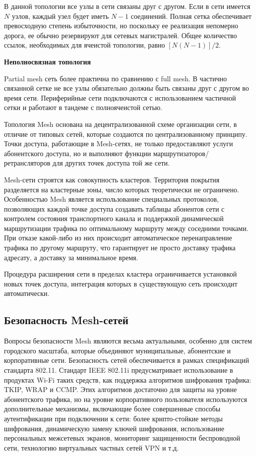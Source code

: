 \documentclass[a4paper]{article}
\begin{document}
В данной топологии все узлы в сети связаны друг с другом. Если в сети имеется $N$ узлов, каждый узел будет иметь $N-1$ соединений.
 Полная сетка обеспечивает превосходную степень избыточности, но поскольку ее реализация непомерно дорога, ее обычно резервируют для сетевых магистралей.
 Общее количество ссылок, необходимых для ячеистой топологии, равно $[N(N-1)]/2$.

\textbf{Неполносвязная топология}

Partial mesh сеть более практична по сравнению с full mesh. В частично связанной сетке не все узлы обязательно должны быть связаны друг с другом во время сети. 
Периферийные сети подключаются с использованием частичной сетки и работают в тандеме с полноячеистой сетью.

Топология Mesh основана на децентрализованной схеме организации сети, в отличие от типовых сетей, которые создаются по централизованному принципу.
 Точки доступа, работающие в Mesh-сетях, не только предоставляют услуги абонентского доступа, но и выполняют функции маршрутизаторов/ретрансляторов для других точек доступа той же сети. 

Mesh-сети строятся как совокупность кластеров. Территория покрытия разделяется на кластерные зоны, число которых теоретически не ограничено. 
Особенностью Mesh является использование специальных протоколов, позволяющих каждой точке доступа создавать таблицы абонентов сети с контролем состояния транспортного канала и поддержкой динамической маршрутизации трафика по оптимальному маршруту между соседними точками. 
При отказе какой-либо из них происходит автоматическое перенаправление трафика по другому маршруту, что гарантирует не просто доставку трафика адресату, а доставку за минимальное время.

Процедура расширения сети в пределах кластера ограничивается установкой новых точек доступа, интеграция которых в существующую сеть происходит автоматически.

\subsection{Безопасность Mesh-сетей}

Вопросы безопасности Mesh  являются весьма актуальными, особенно для систем городского масштаба, которые объединяют муниципальные, абонентские и корпоративные сети. 
Безопасность сетей обеспечивается в рамках спецификаций стандарта 802.11. Стандарт IEEE 802.11i предусматривает использование в продуктах Wi-Fi таких средств, как поддержка алгоритмов шифрования трафика: TKIP, WRAP и CCMP.
 Этих алгоритмов достаточно для защиты на уровне абонентского трафика, но на уровне корпоративного пользователя используются дополнительные механизмы, включающие более совершенные способы аутентификации при подключении к сети: более крипто-стойкие методы шифрования, динамическую замену ключей шифрования, использование персональных межсетевых экранов, мониторинг защищенности беспроводной сети, технологию виртуальных частных сетей VPN и т.д.
\end{document}
